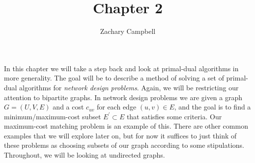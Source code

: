 \documentclass[11pt]{article}
\renewcommand{\'}{^{'}}
\begin{document}
\title{Chapter 2}
\author{Zachary Campbell}

\maketitle
	In this chapter we will take a step back and look at primal-dual algorithms in more generality. 
	The goal will be to describe a method of solving a set of primal-dual algorithms for 
	\emph{network design problems}. Again, we will be restricting our attention to bipartite 
	graphs. In network design problems we are given a graph $G = (U,V,E)$ 
	and a cost $c_{uv}$ for each edge $(u,v)\in E$, and the goal is to find a minimum/maximum-cost 
	subset 
	$E\' \subset E$ that satisfies some criteria. Our maximum-cost matching problem is an example
	of this. There are other common examples that we will explore later on, but for now it suffices 
	to just think of these problems as choosing subsets of our graph according to some 
	stipulations. Throughout, we will be looking at undirected graphs.
\end{document}
